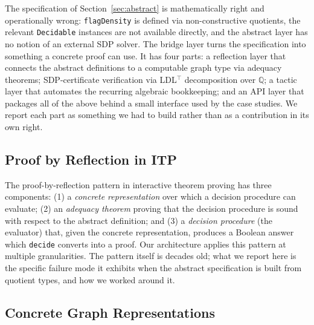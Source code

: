 \documentclass{article}
\newcommand{\Q}{\mathbb{Q}}
\newcommand{\lean}[1]{\texttt{#1}}
\begin{document}
The specification of Section~\ref{sec:abstract} is mathematically right and
operationally wrong: \lean{flagDensity} is defined via non-constructive
quotients, the relevant \lean{Decidable} instances are not available
directly, and the abstract layer has no notion of an external SDP solver.
The bridge layer turns the specification into something a concrete proof can
use.  It has four parts: a reflection layer that connects the abstract
definitions to a computable graph type via adequacy theorems; SDP-certificate
verification via LDL$^\top$ decomposition over $\Q$; a tactic layer that
automates the recurring algebraic bookkeeping; and an API layer that packages
all of the above behind a small interface used by the case studies.  We
report each part as something we had to build rather than as a contribution
in its own right.

\subsection{Proof by Reflection in ITP}

The proof-by-reflection pattern in interactive theorem proving has three
components: (1) a \emph{concrete representation} over which a decision
procedure can evaluate; (2) an \emph{adequacy theorem} proving that the
decision procedure is sound with respect to the abstract definition; and (3)
a \emph{decision procedure} (the evaluator) that, given the concrete
representation, produces a Boolean answer which \lean{decide} converts into a
proof.  Our architecture applies this pattern at multiple granularities.  The
pattern itself is decades old; what we report here is the specific failure
mode it exhibits when the abstract specification is built from quotient types,
and how we worked around it.

\subsection{Concrete Graph Representations}
\end{document}
